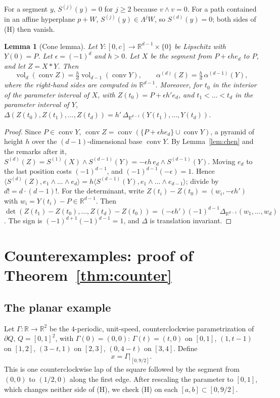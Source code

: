 \documentclass[11pt]{amsart}
\newtheorem{lemma}[theorem]{Lemma}
\theoremstyle{definition}
\newcommand{\R}{\mathbb{R}}
\newcommand{\conv}{\operatorname{conv}}
\newcommand{\vol}{\operatorname{vol}}
\begin{document}
For a segment $y$, $S^{(j)}(y)=0$ for $j\ge2$ because $v\wedge v=0$.
For a path contained in an affine hyperplane $p+W$, $S^{(j)}(y)\in\Lambda^jW$, so $S^{(d)}(y)=0$; both sides of (H) then vanish.

\begin{lemma}[Cone lemma]\label{lem:cone}
Let $Y:[0,c]\to\R^{d-1}\times\{0\}$ be Lipschitz with $Y(0)=P$. Let $\epsilon=(-1)^d$ and $h>0$. Let $X$ be the segment from
$P+\epsilon h e_d$ to $P$, and let $Z=X*Y$. Then
\[
\vol_d(\conv Z)=\tfrac hd\vol_{d-1}(\conv Y),\qquad \alpha^{(d)}(Z)=\tfrac hd\,\alpha^{(d-1)}(Y),
\]
where the right-hand sides are computed in $\R^{d-1}$. Moreover, for $t_0$ in the interior of the parameter interval of $X$,
with $Z(t_0)=P+\epsilon h'e_d$, and $t_1<\dots<t_d$ in the parameter interval of $Y$,
$\Delta(Z(t_0),Z(t_1),\dots,Z(t_d))=h'\,\Delta_{\R^{d-1}}(Y(t_1),\dots,Y(t_d))$.
\end{lemma}
\begin{proof}
Since $P\in\conv Y$, $\conv Z=\conv(\{P+\epsilon he_d\}\cup\conv Y)$, a pyramid of height $h$ over the $(d-1)$-dimensional base $\conv Y$.
By Lemma~\ref{lem:chen} and the remarks after it, $S^{(d)}(Z)=S^{(1)}(X)\wedge S^{(d-1)}(Y)=-\epsilon h\,e_d\wedge S^{(d-1)}(Y)$.
Moving $e_d$ to the last position costs $(-1)^{d-1}$, and $(-1)^{d-1}(-\epsilon)=1$. Hence
$\langle S^{(d)}(Z),e_1\wedge\dots\wedge e_d\rangle=h\langle S^{(d-1)}(Y),e_1\wedge\dots\wedge e_{d-1}\rangle$; divide by $d!=d\cdot(d-1)!$.
For the determinant, write $Z(t_i)-Z(t_0)=(w_i,-\epsilon h')$ with $w_i=Y(t_i)-P\in\R^{d-1}$. Then
$\det(Z(t_1)-Z(t_0),\dots,Z(t_d)-Z(t_0))=(-\epsilon h')(-1)^{d-1}\Delta_{\R^{d-1}}(w_1,\dots,w_d)$.
The sign is $(-1)^{d+1}(-1)^{d-1}=1$, and $\Delta$ is translation invariant.
\end{proof}

\section{Counterexamples: proof of Theorem~\ref{thm:counter}}

\subsection*{The planar example}
Let $\Gamma:\R\to\R^2$ be the $4$-periodic, unit-speed, counterclockwise parametrization of $\partial Q$, $Q=[0,1]^2$, with
$\Gamma(0)=(0,0)$: $\Gamma(t)=(t,0)$ on $[0,1]$, $(1,t-1)$ on $[1,2]$, $(3-t,1)$ on $[2,3]$, $(0,4-t)$ on $[3,4]$. Define
\[
x=\Gamma|_{[0,9/2]}.
\]
This is one counterclockwise lap of the square followed by the segment from $(0,0)$ to $(1/2,0)$ along the first edge.
After rescaling the parameter to $[0,1]$, which changes neither side of (H), we check (H) on each $[a,b]\subset[0,9/2]$.
\end{document}
